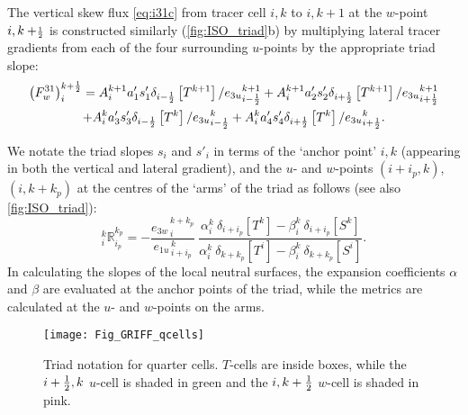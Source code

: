 \documentclass[../tex_main/NEMO_manual]{subfiles}
\begin{document}
 The vertical skew flux \autoref{eq:i31c} from tracer cell $i,k$ to $i,k+1$ at the
$w$-point $i,k+\scriptstyle\frac{1}{2}$ is constructed similarly (\autoref{fig:ISO_triad}b)
by multiplying lateral tracer gradients from each of the four
surrounding $u$-points by the appropriate triad slope:
\begin{multline}
  \label{eq:i31}
  \left( F_w^{31} \right) _i ^{k+\frac{1}{2}} =  {A}_i^{k+1} a_{1}'
  s_{1}' \delta _{i-\frac{1}{2}} \left[ T^{k+1} \right]/{e_{3u}}_{i-\frac{1}{2}}^{k+1}
   +{A}_i^{k+1} a_{2}' s_{2}' \delta _{i+\frac{1}{2}} \left[ T^{k+1} \right]/{e_{3u}}_{i+\frac{1}{2}}^{k+1}\\
  + {A}_i^k a_{3}' s_{3}' \delta _{i-\frac{1}{2}} \left[ T^k\right]/{e_{3u}}_{i-\frac{1}{2}}^k
  +{A}_i^k a_{4}' s_{4}' \delta _{i+\frac{1}{2}} \left[ T^k \right]/{e_{3u}}_{i+\frac{1}{2}}^k.
\end{multline}

We notate the triad slopes $s_i$ and $s'_i$ in terms of the `anchor point' $i,k$
(appearing in both the vertical and lateral gradient), and the $u$- and
$w$-points $(i+i_p,k)$, $(i,k+k_p)$ at the centres of the `arms' of the
triad as follows (see also \autoref{fig:ISO_triad}):
\begin{equation}
  \label{eq:R}
  _i^k \mathbb{R}_{i_p}^{k_p}
  =-\frac{ {e_{3w}}_{\,i}^{\,k+k_p}} { {e_{1u}}_{\,i+i_p}^{\,k}}
  \
  \frac
  { \alpha_i^k  \ \delta_{i+i_p}[T^k] - \beta_i^k \ \delta_{i+i_p}[S^k] }
  { \alpha_i^k  \ \delta_{k+k_p}[T^i] - \beta_i^k \ \delta_{k+k_p}[S^i] }.
\end{equation}
In calculating the slopes of the local neutral surfaces, 
the expansion coefficients $\alpha$ and $\beta$ are evaluated at the anchor points of the triad, 
while the metrics are calculated at the $u$- and $w$-points on the arms.

\begin{figure}[tb] \begin{center}
    \texttt{[image: Fig\_GRIFF\_qcells]}
    \caption{   \protect\label{fig:qcells}
    Triad notation for quarter cells. $T$-cells are inside
      boxes, while the  $i+\textstyle\frac{1}{2},k$ $u$-cell is shaded in green and the
      $i,k+\textstyle\frac{1}{2}$ $w$-cell is shaded in pink.}
  \end{center} \end{figure}
\end{document}
